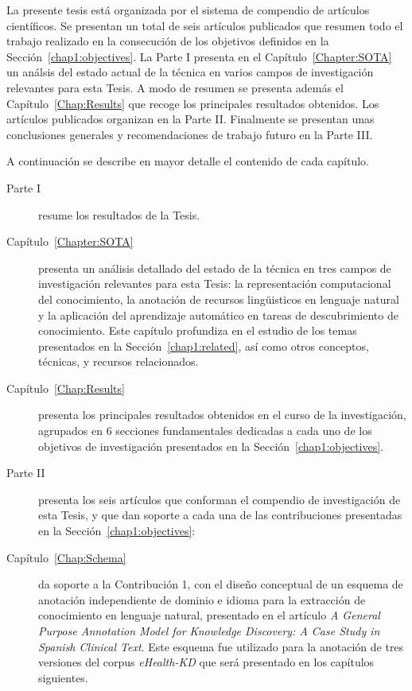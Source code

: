 La presente tesis está organizada por el sistema de compendio de artículos científicos. Se presentan un total de seis artículos publicados que resumen todo el trabajo realizado en la consecución de los objetivos definidos en la Sección~\ref{chap1:objectives}.
La Parte I presenta en el Capítulo~\ref{Chapter:SOTA} un análsis del estado actual de la técnica en varios campos de investigación relevantes para esta Tesis.
A modo de resumen se presenta además el Capítulo~\ref{Chap:Results} que recoge los principales resultados obtenidos.
Los artículos publicados organizan en la Parte II.
Finalmente se presentan unas conclusiones generales y recomendaciones de trabajo futuro en la Parte III.

A continuación se describe en mayor detalle el contenido de cada capítulo.

\begin{description}
\item[Parte I] resume los resultados de la Tesis.

\item[Capítulo~\ref{Chapter:SOTA}] presenta un análisis detallado del estado de la técnica en tres campos de investigación relevantes para esta Tesis: la representación computacional del conocimiento, la anotación de recursos lingüisticos en lenguaje natural y la aplicación del aprendizaje automático en tareas de descubrimiento de conocimiento. Este capítulo profundiza en el estudio de los temas presentados en la Sección~\ref{chap1:related}, así como otros conceptos, técnicas, y recursos relacionados.

\item [Capítulo~\ref{Chap:Results}] presenta los principales resultados obtenidos en el curso de la investigación, agrupados en 6 secciones fundamentales dedicadas a cada uno de los objetivos de investigación presentados en la Sección~\ref{chap1:objectives}.

\item[Parte II] presenta los seis artículos que conforman el compendio de investigación de esta Tesis, y que dan soporte a cada una de las contribuciones presentadas en la Sección~\ref{chap1:objectives}:

\item [Capítulo~\ref{Chap:Schema}] da soporte a la Contribución 1, con el diseño conceptual de un esquema de anotación independiente de dominio e idioma para la extracción de conocimiento en lenguaje natural, presentado en el artículo \textit{A General Purpose Annotation Model for Knowledge Discovery: A Case Study in Spanish Clinical Text}. Este esquema fue utilizado para la anotación de tres versiones del corpus \textit{eHealth-KD} que será presentado en los capítulos siguientes.


\end{description}
